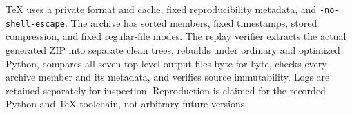 TeX uses a private format and cache, fixed reproducibility metadata, and \texttt{-no-shell-escape}. The archive has sorted members, fixed timestamps, stored compression, and fixed regular-file modes. The replay verifier extracts the actual generated ZIP into separate clean trees, rebuilds under ordinary and optimized Python, compares all seven top-level output files byte for byte, checks every archive member and its metadata, and verifies source immutability. Logs are retained separately for inspection. Reproduction is claimed for the recorded Python and TeX toolchain, not arbitrary future versions.
